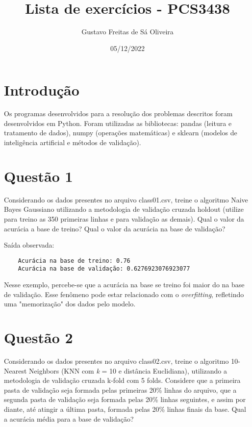 \documentclass[11pt]{article}
\title{Lista de exercícios - PCS3438}
\author{Gustavo Freitas de Sá Oliveira}
\date{05/12/2022}
\begin{document}
\maketitle

\section{Introdução}

Os programas desenvolvidos para a resolução dos problemas descritos foram desenvolvidos em Python. Foram utilizadas as bibliotecas: pandas (leitura e tratamento de dados), numpy (operações matemáticas) e sklearn (modelos de inteligência artificial e métodos de validação).

\section{Questão 1}

Considerando os dados presentes no arquivo class01.csv, treine o algoritmo Naive Bayes Gaussiano utilizando a metodologia de validação cruzada holdout (utilize para treino as 350 primeiras linhas e para validação as demais). Qual o valor da acurácia a base de treino? Qual o valor da acurácia na base de validação?



Saída observada:

\begin{lstlisting}
    Acurácia na base de treino: 0.76
    Acurácia na base de validação: 0.6276923076923077
\end{lstlisting}

Nesse exemplo, percebe-se que a acurácia na base se treino foi maior do na base de validação. Esse fenômeno pode estar relacionado com o \emph{overfitting}, refletindo uma "memorização" dos dados pelo modelo.

\section{Questão 2}

Considerando os dados presentes no arquivo class02.csv, treine o algoritmo 10-Nearest Neighbors (KNN com \emph{k} = 10 e distância Euclidiana), utilizando a metodologia de validação cruzada k-fold com 5 folds. Considere que a primeira pasta de validação seja formada pelas primeiras 20\% linhas do arquivo, que a segunda pasta de validação seja formada pelas 20\% linhas seguintes, e assim por diante, até atingir a última pasta, formada pelas 20\% linhas finais da base. Qual a acurácia média para a base de validação?
\end{document}
